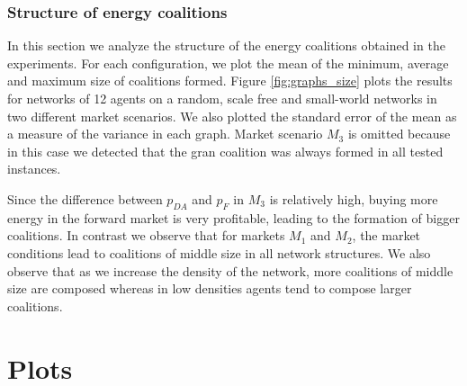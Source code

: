\documentclass[11pt, twoside, titlepage, a4paper, openright]{report}
\begin{document}
\subsubsection{Structure of energy coalitions}
In this section we analyze the structure of the energy coalitions obtained in
the experiments. For each configuration, we plot the mean of the minimum,
average and maximum size of coalitions formed. Figure \ref{fig:graphs_size}
plots the results for networks of 12 agents on a random, scale free and
small-world networks in two different market scenarios. We also plotted
the standard error of the mean as a measure of the variance in each graph.
Market scenario $M_3$ is omitted because in this case we detected that the gran coalition was always formed in all tested instances.

\noindent Since the difference between $p_{DA}$ and $p_{F}$ in $M_3$ is relatively high, buying more energy in the forward market is very profitable, leading to the formation of bigger coalitions. In contrast we observe that for markets $M_1$ and $M_2$, the market conditions lead to
coalitions of middle size in all network structures. We also observe that as we
increase the density of the network, more coalitions of middle size are composed
whereas in low densities agents tend to compose larger coalitions.

\section{Plots}
\end{document}
